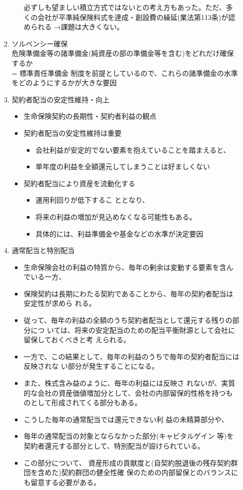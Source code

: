 \documentclass[report,gutter=10mm,fore-edge=10mm,uplatex,dvipdfmx]{jlreq}
\begin{document}
\begin{enumerate}
\begin{enumerate}
\begin{enumerate}
\begin{itemize}
\end{itemize}
必ずしも望ましい積立方式ではないとの考え方もあった。ただ、多くの会社が平準純保険料式を達成・創設費の繰延(業法第113条)が認められる →課題は大きくない。
\end{enumerate}
 \item ソルベンシー確保\\
危険準備金等の諸準備金(純資産の部の準備金等を含む)をどれだけ確保するか \\
= 標準責任準備金
制度を前提としているので、これらの諸準備金の水準をどのようにするかが大きな要因
 \item 契約者配当の安定性維持・向上
\begin{itemize}
 \item 生命保険契約の長期性・契約者利益の観点
 \item 契約者配当の安定性維持は重要
\begin{itemize}
 \item 会社利益が安定的でない要素を抱えていることを踏まえると、
 \item 単年度の利益を全額還元してしまうことは好ましくない
\end{itemize}
 \item 契約者配当により資産を流動化する
\begin{itemize}
 \item 運用利回りが低下するこ
ととなり、
 \item 将来の利益の増加が見込めなくなる可能性もある。
 \item 具体的には、利益準備金や基金などの水準が決定要因
\end{itemize}
\end{itemize}
 \item 通常配当と特別配当
\begin{itemize}
 \item 生命保険会社の利益の特質から、毎年の剰余は変動する要素を含んでいる一方、
 \item 保険契約は長期にわたる契約であることから、毎年の契約者配当は安定性が求めら
れる。
 \item 従って、毎年の利益の全額のうち契約者配当として還元する残りの部分につ
いては、将来の安定配当のための配当平衡財源として会社に留保しておくべきと考
えられる。
 \item 一方で、この結果として、毎年の利益のうちで毎年の契約者配当には反映されな
い部分が発生することになる。
 \item また、株式含み益のように、毎年の利益には反映さ
れないが、実質的な会社の資産価値増加分として、会社の内部留保的性格を持つも
のとして形成されてくる部分もある。
 \item こうした毎年の通常配当では還元できない利
益の未精算部分や、
 \item 
毎年の通常配当の対象とならなかった部分(キャビタルゲイン
等)を契約者還元する部分として、特別配当が設けられている。
 \item 
この部分について、
資産形成の貢献度と(自契約脱退後の残存契約群団を含めた)契約群団の健全性確
保のための内部留保とのバランスにも留意する必要がある。
\end{itemize}
\end{enumerate}
\end{enumerate}
\end{document}
